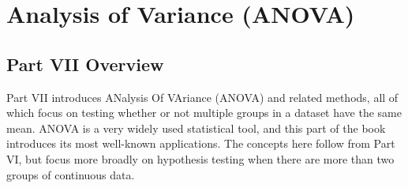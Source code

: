 \documentclass[
  openany]{scrbook}
\begin{document}
\begin{verbatim}






\end{verbatim}

\hypertarget{part-analysis-of-variance-anova}{%
\part{Analysis of Variance (ANOVA)}\label{part-analysis-of-variance-anova}}

\hypertarget{Week8}{%
\chapter*{Part VII Overview}\label{Week8}}

Part VII introduces ANalysis Of VAriance (ANOVA) and related methods, all of which focus on testing whether or not multiple groups in a dataset have the same mean.
ANOVA is a very widely used statistical tool, and this part of the book introduces its most well-known applications.
The concepts here follow from Part VI, but focus more broadly on hypothesis testing when there are more than two groups of continuous data.
\end{document}
